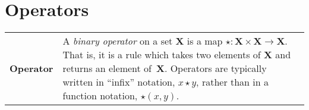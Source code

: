 \documentclass[10pt, a4paper, twocolumn]{article}
\newcommand{\defn}[1]{\textbf{\textsf{#1}}}
\newcommand{\set}[1]{\mathbold{#1}}
\begin{document}
\section*{Operators}
\begin{tabularx}{\columnwidth}{@{}p{}>{\raggedright\arraybackslash}X@{}}
  \toprule
  \defn{Operator} & A \emph{binary operator} on a set $\set{X}$ is a map $\star \colon \set{X}\times\set{X} \to \set{X}$. That is, it is a rule which takes two elements of $\set{X}$ and returns an element of~$\set{X}$. Operators are typically written in “infix” notation, $x\star y$, rather than in a function notation, $\star(x,y)$. \\


  
\end{tabularx}
\end{document}
